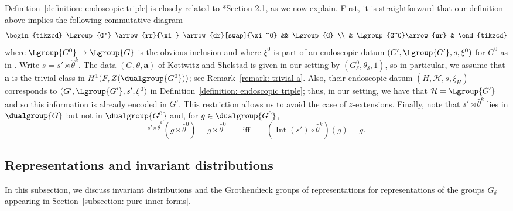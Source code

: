 \documentclass[11pt,letterpaper]{amsart}
\numberwithin{equation}{section}
\begin{document}
\begin{remark}\label{remark: endoscopic KS}
Definition~\ref{definition: endoscopic triple} is closely related to \cite{KS99}*{Section 2.1}, as we now explain.
First, it is straightforward that our definition above implies the following commutative diagram
\[
\begin{tikzcd}
    \Lgroup{G'} \arrow{rr}{\xi} \arrow{dr}[swap]{\xi^0} && \Lgroup{G} \\
    & \Lgroup{G^0}\arrow{ur} & 
\end{tikzcd}
\] 
where $\Lgroup{G^0}\to \Lgroup{G}$ is the obvious inclusion and where $\xi^0$ is part of an endoscopic datum $(G',\Lgroup{G'},s,\xi^0)$ for $G^0$ as in \cite{KS99}.
Write $s=s'\rtimes\hat{\theta}^k$.
The data $(G,\theta,\textbf{a})$ of Kottwitz and Shelstad is given in our setting by $(G_\delta^0,\theta_\delta,1)$, so in particular, we assume that $\textbf{a}$ is the trivial class in $H^1(F,Z(\dualgroup{G^0}))$;
see Remark~\ref{remark: trivial a}.
Also, their endoscopic datum $(H,\mathcal{H},s,\xi_H)$ corresponds to $(G',\Lgroup{G'},s',\xi^0)$ in Definition~\ref{definition: endoscopic triple}; thus, in our setting, we have that $\mathcal{H} = \Lgroup{G'}$ and so this information is already encoded in $G'$. This restriction allows us to avoid the case of $z$-extensions. 
Finally, note that ${s'\rtimes{\hat\theta}^k}$ lies in $\dualgroup{G}$ but not in $\dualgroup{G^0}$ and, for $g\in \dualgroup{G^0}$, 
\[
{}^{{s'\rtimes{\hat\theta}^k}}(g\rtimes{\hat\theta}^0) = g\rtimes{\hat\theta}^0
\qquad\textrm{iff}\qquad
(\operatorname{Int}(s')\circ{\hat\theta}^k)(g) = g.
\]
\end{remark}




\subsection{Representations and invariant distributions}
\label{subsection: representations}

In this subsection, we discuss invariant distributions and the Grothendieck groups of representations for representations of the groups $G_\delta$ appearing in Section~\ref{subsection: pure inner forms}. 
\end{document}
